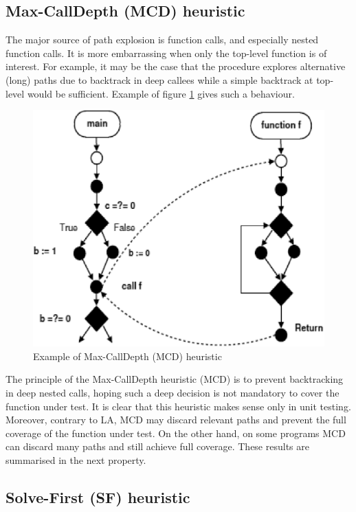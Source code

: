 \subsection{Max-CallDepth (MCD) heuristic}
The major source of path explosion is function calls, and especially nested function calls. It is more embarrassing when only the top-level function is of interest. For example, it may be the case that the procedure explores alternative (long) paths due to backtrack in deep callees while a simple backtrack at top-level would be sufficient. Example of figure \ref{fig:mcd} gives such a behaviour.

\begin{figure}
\centering
\includegraphics[scale=0.35,clip]{fig/mcd.eps} 
\caption{\label{fig:mcd}Example of Max-CallDepth (MCD) heuristic} 
\end{figure}

The principle of the Max-CallDepth heuristic (MCD) is to prevent backtracking in deep nested calls, hoping such a deep decision is not mandatory to cover the function under test. It is clear that this heuristic makes sense only in unit testing. Moreover, contrary to LA, MCD may discard relevant paths and prevent the full coverage of the function under test. On the other hand, on some programs MCD can discard many paths and still achieve full coverage. These results are summarised in the next property.

\subsection{Solve-First (SF) heuristic}


